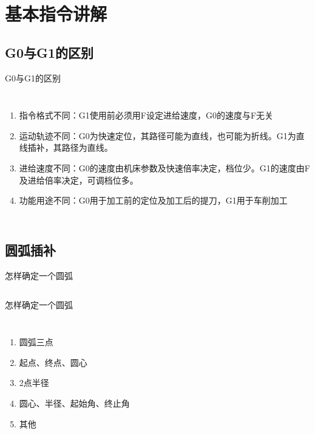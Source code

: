 \documentclass[UTF8,zihao=-4]{ctexbeamer}
\begin{document}
\section{基本指令讲解}
\subsection{G0与G1的区别}
\begin{frame}{G0与G1的区别}
    \begin{columns}
        \column{\textwidth}
\begin{enumerate}
    \item 指令格式不同：G1使用前必须用F设定进给速度，G0的速度与F无关 
    \item 运动轨迹不同：G0为快速定位，其路径可能为直线，也可能为折线。G1为直线插补，其路径为直线。
    \item 进给速度不同：G0的速度由机床参数及快速倍率决定，档位少。G1的速度由F及进给倍率决定，可调档位多。
    \item 功能用途不同：G0用于加工前的定位及加工后的提刀，G1用于车削加工
\end{enumerate}
    \end{columns}
\end{frame}

\subsection{圆弧插补}
\begin{frame}{怎样确定一个圆弧}
    \begin{columns}
        \column{\textwidth}
    \end{columns}
\end{frame}

\begin{frame}{怎样确定一个圆弧}
    \begin{columns}
        \column{\textwidth}
        \begin{enumerate}
            \item 圆弧三点
            \item 起点、终点、圆心
            \item 2点半径
            \item 圆心、半径、起始角、终止角
            \item 其他
        \end{enumerate}
    \end{columns}
\end{frame}
\end{document}
